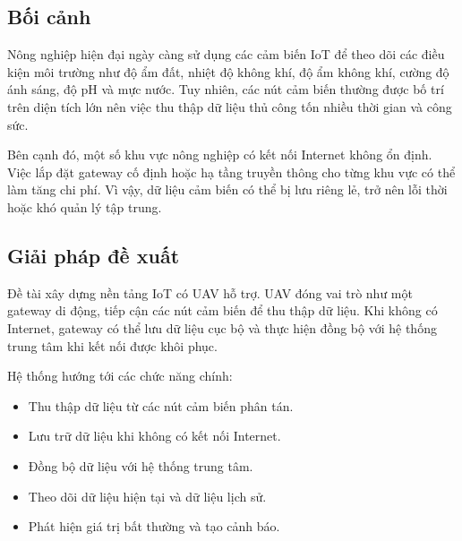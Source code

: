 
\subsection{Bối cảnh}
Nông nghiệp hiện đại ngày càng sử dụng các cảm biến IoT để theo dõi các điều kiện môi trường như độ ẩm đất, nhiệt độ không khí, độ ẩm không khí, cường độ ánh sáng, độ pH và mực nước. Tuy nhiên, các nút cảm biến thường được bố trí trên diện tích lớn nên việc thu thập dữ liệu thủ công tốn nhiều thời gian và công sức.

Bên cạnh đó, một số khu vực nông nghiệp có kết nối Internet không ổn định. Việc lắp đặt gateway cố định hoặc hạ tầng truyền thông cho từng khu vực có thể làm tăng chi phí. Vì vậy, dữ liệu cảm biến có thể bị lưu riêng lẻ, trở nên lỗi thời hoặc khó quản lý tập trung.

\subsection{Giải pháp đề xuất}
Đề tài xây dựng nền tảng IoT có UAV hỗ trợ. UAV đóng vai trò như một gateway di động, tiếp cận các nút cảm biến để thu thập dữ liệu. Khi không có Internet, gateway có thể lưu dữ liệu cục bộ và thực hiện đồng bộ với hệ thống trung tâm khi kết nối được khôi phục.

Hệ thống hướng tới các chức năng chính:
\begin{itemize}
    \item Thu thập dữ liệu từ các nút cảm biến phân tán.
    \item Lưu trữ dữ liệu khi không có kết nối Internet.
    \item Đồng bộ dữ liệu với hệ thống trung tâm.
    \item Theo dõi dữ liệu hiện tại và dữ liệu lịch sử.
    \item Phát hiện giá trị bất thường và tạo cảnh báo.
\end{itemize}

